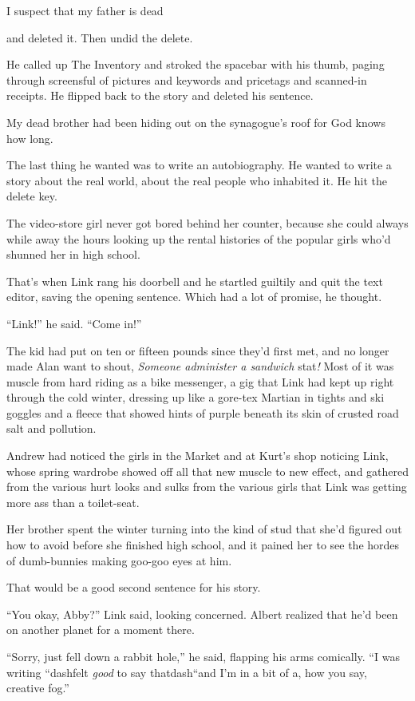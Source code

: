 I suspect that my father is dead

and deleted it.  Then undid the delete.

He called up The Inventory and stroked the spacebar with his thumb,
paging through screensful of pictures and keywords and pricetags and
scanned-in receipts.  He flipped back to the story and deleted his
sentence.

My dead brother had been hiding out on the synagogue's roof for God
knows how long.

The last thing he wanted was to write an autobiography.  He wanted to
write a story about the real world, about the real people who
inhabited it.  He hit the delete key.

The video-store girl never got bored behind her counter, because she
could always while away the hours looking up the rental histories of
the popular girls who'd shunned her in high school.

That's when Link rang his doorbell and he startled guiltily and quit
the text editor, saving the opening sentence.  Which had a lot of
promise, he thought.

``Link!'' he said.  ``Come in!''

The kid had put on ten or fifteen pounds since they'd first met, and
no longer made Alan want to shout, \textit{Someone administer a
sandwich} stat\textit{!} Most of it was muscle from hard riding as a
bike messenger, a gig that Link had kept up right through the cold
winter, dressing up like a gore-tex Martian in tights and ski goggles
and a fleece that showed hints of purple beneath its skin of crusted
road salt and pollution.

Andrew had noticed the girls in the Market and at Kurt's shop noticing
Link, whose spring wardrobe showed off all that new muscle to new
effect, and gathered from the various hurt looks and sulks from the
various girls that Link was getting more ass than a toilet-seat.

Her brother spent the winter turning into the kind of stud that she'd
figured out how to avoid before she finished high school, and it
pained her to see the hordes of dumb-bunnies making goo-goo eyes at
him.

That would be a good second sentence for his story.

``You okay, Abby?'' Link said, looking concerned.  Albert realized
that he'd been on another planet for a moment there.

``Sorry, just fell down a rabbit hole,'' he said, flapping his arms
comically.  ``I was writing ``dash{}felt \textit{good} to say thatdash{}``and
I'm in a bit of a, how you say, creative fog.''

